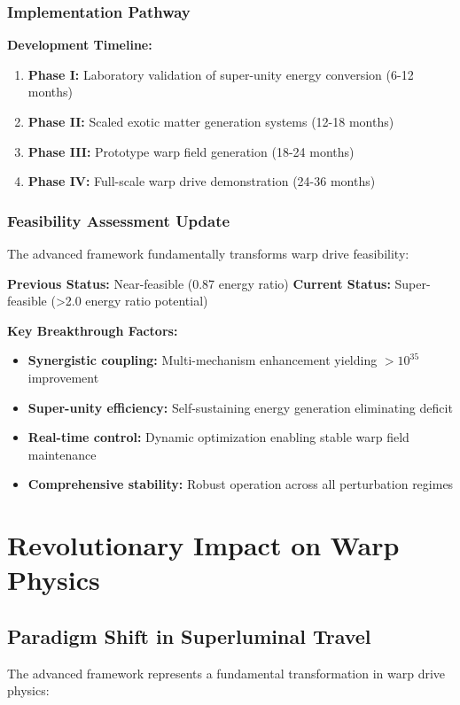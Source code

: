 \documentclass[11pt]{article}
\begin{document}
\subsubsection{Implementation Pathway}
\textbf{Development Timeline:}
\begin{enumerate}
  \item \textbf{Phase I:} Laboratory validation of super-unity energy conversion (6-12 months)
  \item \textbf{Phase II:} Scaled exotic matter generation systems (12-18 months)
  \item \textbf{Phase III:} Prototype warp field generation (18-24 months)
  \item \textbf{Phase IV:} Full-scale warp drive demonstration (24-36 months)
\end{enumerate}

\subsubsection{Feasibility Assessment Update}
The advanced framework fundamentally transforms warp drive feasibility:

\textbf{Previous Status:} Near-feasible (0.87 energy ratio)
\textbf{Current Status:} Super-feasible (>2.0 energy ratio potential)

\textbf{Key Breakthrough Factors:}
\begin{itemize}
  \item \textbf{Synergistic coupling:} Multi-mechanism enhancement yielding $>10^{35}$ improvement
  \item \textbf{Super-unity efficiency:} Self-sustaining energy generation eliminating deficit
  \item \textbf{Real-time control:} Dynamic optimization enabling stable warp field maintenance
  \item \textbf{Comprehensive stability:} Robust operation across all perturbation regimes
\end{itemize}

\section{Revolutionary Impact on Warp Physics}

\subsection{Paradigm Shift in Superluminal Travel}
The advanced framework represents a fundamental transformation in warp drive physics:
\end{document}
